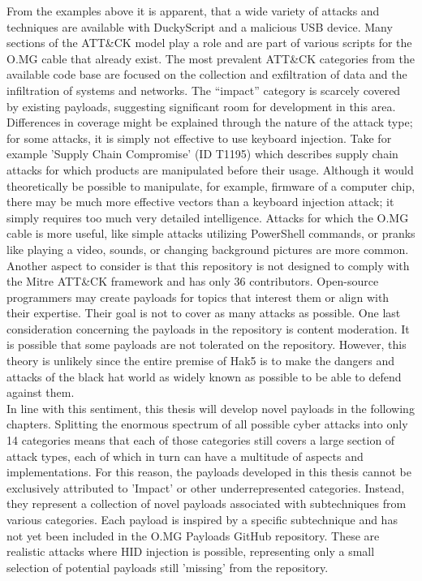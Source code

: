 From the examples above it is apparent, that a wide variety of attacks and techniques are available with DuckyScript and a malicious USB device. Many sections of the ATT\&CK model play a role and are part of various scripts for the O.MG cable that already exist. The most prevalent ATT\&CK categories from the available code base are focused on the collection and exfiltration of data and the infiltration of systems and networks. The ``impact'' category is scarcely covered by existing payloads, suggesting significant room for development in this area.
Differences in coverage might be explained through the nature of the attack type; for some attacks, it is simply not effective to use keyboard injection. Take for example 'Supply Chain Compromise' (ID T1195) \cite{SupplyChainCompromise} which describes supply chain attacks for which products are manipulated before their usage. Although it would theoretically be possible to manipulate, for example, firmware of a computer chip, there may be much more effective vectors than a keyboard injection attack; it simply requires too much very detailed intelligence. Attacks for which the O.MG cable is more useful, like simple attacks utilizing PowerShell commands, or pranks like playing a video, sounds, or changing background pictures are more common. 
Another aspect to consider is that this repository is not designed to comply with the Mitre ATT\&CK framework and has only 36 contributors. Open-source programmers may create payloads for topics that interest them or align with their expertise. Their goal is not to cover as many attacks as possible. One last consideration concerning the payloads in the repository is content moderation. It is possible that some payloads are not tolerated on the repository. However, this theory is unlikely since the entire premise of Hak5 is to make the dangers and attacks of the black hat world as widely known as possible to be able to defend against them.\\  
In line with this sentiment, this thesis will develop novel payloads in the following chapters. Splitting the enormous spectrum of all possible cyber attacks into only 14 categories means that each of those categories still covers a large section of attack types, each of which in turn can have a multitude of aspects and implementations. For this reason, the payloads developed in this thesis cannot be exclusively attributed to 'Impact' or other underrepresented categories. Instead, they represent a collection of novel payloads associated with subtechniques from various categories. Each payload is inspired by a specific subtechnique and has not yet been included in the O.MG Payloads GitHub repository. These are realistic attacks where HID injection is possible, representing only a small selection of potential payloads still 'missing' from the repository.

